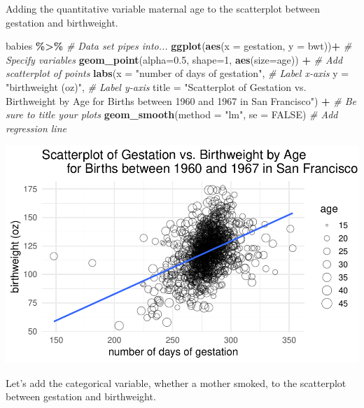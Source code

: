 \documentclass[
]{report}
\newenvironment{Shaded}{\begin{snugshade}}{\end{snugshade}}
\newcommand{\AttributeTok}[1]{\textcolor[rgb]{0.13,0.29,0.53}{#1}}
\newcommand{\CommentTok}[1]{\textcolor[rgb]{0.56,0.35,0.01}{\textit{#1}}}
\newcommand{\ConstantTok}[1]{\textcolor[rgb]{0.56,0.35,0.01}{#1}}
\newcommand{\DecValTok}[1]{\textcolor[rgb]{0.00,0.00,0.81}{#1}}
\newcommand{\FloatTok}[1]{\textcolor[rgb]{0.00,0.00,0.81}{#1}}
\newcommand{\FunctionTok}[1]{\textcolor[rgb]{0.13,0.29,0.53}{\textbf{#1}}}
\newcommand{\NormalTok}[1]{#1}
\newcommand{\SpecialCharTok}[1]{\textcolor[rgb]{0.81,0.36,0.00}{\textbf{#1}}}
\newcommand{\StringTok}[1]{\textcolor[rgb]{0.31,0.60,0.02}{#1}}
\begin{document}
Adding the quantitative variable maternal age to the scatterplot between gestation and birthweight.

\begin{Shaded}
\begin{Highlighting}[]
\NormalTok{babies }\SpecialCharTok{\%\textgreater{}\%} \CommentTok{\# Data set pipes into...}
\FunctionTok{ggplot}\NormalTok{(}\FunctionTok{aes}\NormalTok{(}\AttributeTok{x =}\NormalTok{ gestation, }\AttributeTok{y =}\NormalTok{ bwt))}\SpecialCharTok{+}  \CommentTok{\# Specify variables}
  \FunctionTok{geom\_point}\NormalTok{(}\AttributeTok{alpha=}\FloatTok{0.5}\NormalTok{, }\AttributeTok{shape=}\DecValTok{1}\NormalTok{, }\FunctionTok{aes}\NormalTok{(}\AttributeTok{size=}\NormalTok{age)) }\SpecialCharTok{+}  \CommentTok{\# Add scatterplot of points}
  \FunctionTok{labs}\NormalTok{(}\AttributeTok{x =} \StringTok{"number of days of gestation"}\NormalTok{,  }\CommentTok{\# Label x{-}axis}
       \AttributeTok{y =} \StringTok{"birthweight (oz)"}\NormalTok{,  }\CommentTok{\# Label y{-}axis}
       \AttributeTok{title =} \StringTok{"Scatterplot of Gestation vs. Birthweight by Age }
\StringTok{       for Births between 1960 and 1967 in San Francisco"}\NormalTok{) }\SpecialCharTok{+} 
    \CommentTok{\# Be sure to title your plots}
  \FunctionTok{geom\_smooth}\NormalTok{(}\AttributeTok{method =} \StringTok{"lm"}\NormalTok{, }\AttributeTok{se =} \ConstantTok{FALSE}\NormalTok{)  }\CommentTok{\# Add regression line}
\end{Highlighting}
\end{Shaded}

\begin{center}\includegraphics[width=0.8\linewidth]{13-VN13-regression_files/figure-latex/unnamed-chunk-7-1} \end{center}

\newpage

Let's add the categorical variable, whether a mother smoked, to the scatterplot between gestation and birthweight.
\end{document}
